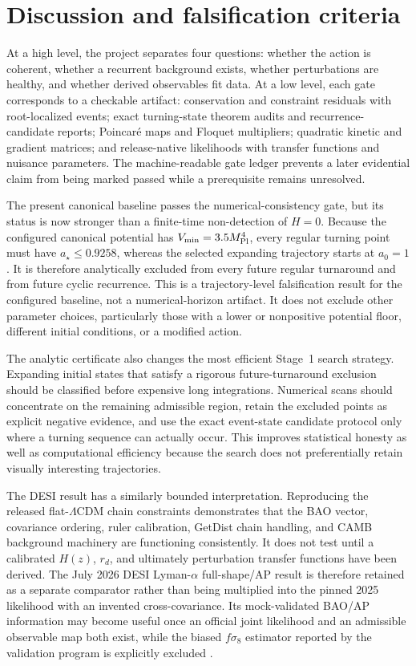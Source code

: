 \section{Discussion and falsification criteria}
At a high level, the project separates four questions: whether the action is coherent, whether a recurrent background exists, whether perturbations are healthy, and whether derived observables fit data. At a low level, each gate corresponds to a checkable artifact: conservation and constraint residuals with root-localized events; exact turning-state theorem audits and recurrence-candidate reports; Poincar\'e maps and Floquet multipliers; quadratic kinetic and gradient matrices; and release-native likelihoods with transfer functions and nuisance parameters. The machine-readable gate ledger prevents a later evidential claim from being marked passed while a prerequisite remains unresolved.

The present canonical baseline passes the numerical-consistency gate, but its status is now stronger than a finite-time non-detection of $H=0$. Because the configured canonical potential has $V_{\min}=3.5M_{\mathrm{Pl}}^4$, every regular turning point must have $a_\star\le0.9258$, whereas the selected expanding trajectory starts at $a_0=1$. It is therefore analytically excluded from every future regular turnaround and from future cyclic recurrence. This is a trajectory-level falsification result for the configured baseline, not a numerical-horizon artifact. It does not exclude other parameter choices, particularly those with a lower or nonpositive potential floor, different initial conditions, or a modified action.

The analytic certificate also changes the most efficient Stage~1 search strategy. Expanding initial states that satisfy a rigorous future-turnaround exclusion should be classified before expensive long integrations. Numerical scans should concentrate on the remaining admissible region, retain the excluded points as explicit negative evidence, and use the exact event-state candidate protocol only where a turning sequence can actually occur. This improves statistical honesty as well as computational efficiency because the search does not preferentially retain visually interesting trajectories.

The DESI result has a similarly bounded interpretation. Reproducing the released flat-$\Lambda$CDM chain constraints demonstrates that the BAO vector, covariance ordering, ruler calibration, GetDist chain handling, and CAMB background machinery are functioning consistently. It does not test \SCPC{} until a calibrated \SCPC{} $H(z)$, $r_d$, and ultimately perturbation transfer functions have been derived. The July 2026 DESI Lyman-$\alpha$ full-shape/AP result is therefore retained as a separate comparator rather than being multiplied into the pinned 2025 likelihood with an invented cross-covariance. Its mock-validated BAO/AP information may become useful once an official joint likelihood and an admissible \SCPC{} observable map both exist, while the biased $f\sigma_8$ estimator reported by the validation program is explicitly excluded \cite{desi2026iv,desi2026lyavalidation}.

